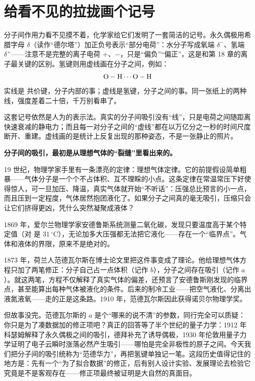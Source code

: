 \section{给看不见的拉拢画个记号}

分子间作用力看不见摸不着，化学家给它们发明了一套简洁的记号。永久偶极用希腊字母 $\delta$（读作“德尔塔”）加正负号表示“部分电荷”：水分子写成氧端 $\delta^{-}$、氢端 $\delta^{+}$——注意不是完整的离子电荷 $+$、$-$，只是“偏负”“偏正”，这是和第 18 章的离子最关键的区别。氢键则用虚线画在分子之间，例如：
\[
\mathrm{O-H \cdots O-H}
\]
实线是  共价键，分子内部的事；虚线是氢键，分子之间的事。同一张纸上的两种线，强度差着二十倍，千万别看串了。

这套记号依然是人为的表示法。真实的分子间吸引没有“线”，只是电荷之间随距离快速衰减的静电力；而且每一对分子之间的“虚线”都在以万亿分之一秒的时间尺度断开、重建。虚线画的是统计上反复出现的那种姿态，不是一张静止的照片。

\begin{zhengju}
\textbf{分子间的吸引，最初是从理想气体的“裂缝”里看出来的。}

19 世纪，物理学家手里有一条漂亮的定律：理想气体定律。它的前提假设简单粗暴——气体分子是一个个不占体积、互不理睬的小点。这条定律在常温常压下好使得惊人，可一旦加压、降温，真实气体就开始“不听话”：压强总比预言的小一点，而且压到一定程度，气体居然抱团液化了。如果分子之间真的毫无吸引，压缩只会让它们挤得更凶，凭什么突然凝聚成液体？

1869 年，爱尔兰物理学家安德鲁斯系统测量二氧化碳，发现只要温度高于某个特定值（对  是 $31\,^{\circ}\mathrm{C}$），无论加多大压强都无法把它液化——存在一个“临界点”。气体和液体的界限，原来不是绝对的。

1873 年，荷兰人范德瓦尔斯在博士论文里把这件事变成了理论。他给理想气体方程只加了两笔修正：分子自己占一点体积（记作 $b$），分子之间存在吸引（记作 $a$）。就这两笔，方程不仅解释了真实气体的偏差，还预言了安德鲁斯刚发现的临界点，甚至能算出每种气体被液化的条件。后来的制冷工业——把空气液化、分离出液氮液氧——走的正是这条路。1910 年，范德瓦尔斯因此获得诺贝尔物理学奖。

但故事没完。范德瓦尔斯的 $a$ 是个“哪来的说不清”的参数，同行完全可以质疑：你只是为了凑数据加的修正项吧？真正的回答等了半个世纪的量子力学：1912 年科瑟姆解释了永久偶极之间的吸引，德拜补充了诱导偶极，1930 年伦敦用量子力学证明了电子云瞬时涨落必然产生吸引——哪怕是完全非极性的原子之间。今天我们把分子间的吸引统称为“范德华力”，再把氢键单独记一笔。这段历史值得记住的地方是：先有一个“为了拟合数据”的修正，后有别人设计实验、发展理论去检验它究竟是不是客观存在——修正项最终被证明是大自然的真面目。
\end{zhengju}

